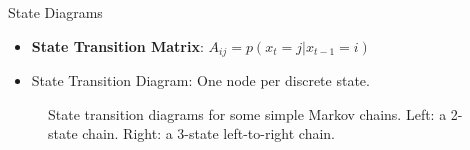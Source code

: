 \documentclass[10pt,mathserif]{beamer}
\begin{document}
\begin{frame}{State Diagrams}
\begin{itemize}
    \item \textbf{State Transition Matrix}:  $A_{ij} = p(x_t = j | x_{t - 1} = i)$
    \item State Transition Diagram: One node per discrete state.
\end{itemize}

\begin{figure}
\centering
{}
\caption{State transition diagrams for some simple Markov chains. Left: a 2-state chain. Right: a 3-state left-to-right chain.}
\end{figure}
\end{frame}
\end{document}
